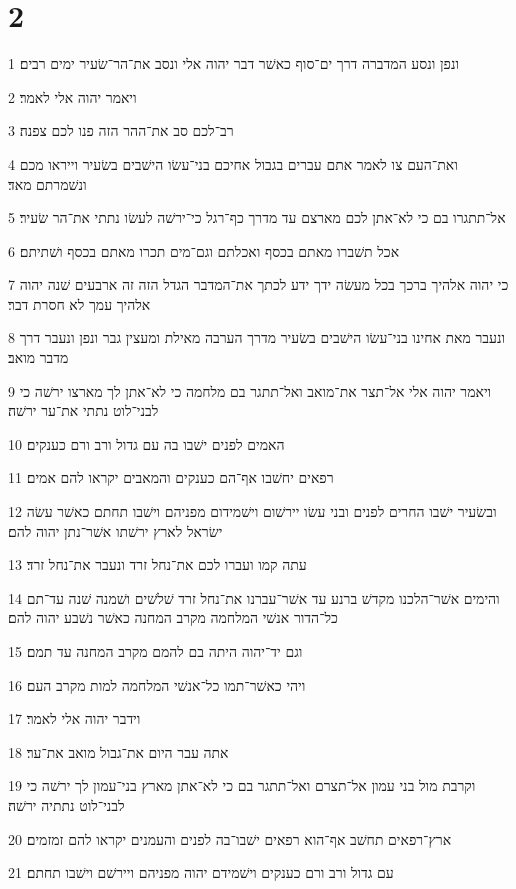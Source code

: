 \chapter{2}

\par 1 ונפן ונסע המדברה דרך ים־סוף כאשׁר דבר יהוה אלי ונסב את־הר־שׂעיר ימים רבים׃
\par 2 ויאמר יהוה אלי לאמר׃
\par 3 רב־לכם סב את־ההר הזה פנו לכם צפנה׃
\par 4 ואת־העם צו לאמר אתם עברים בגבול אחיכם בני־עשׂו הישׁבים בשׂעיר וייראו מכם ונשׁמרתם מאד׃
\par 5 אל־תתגרו בם כי לא־אתן לכם מארצם עד מדרך כף־רגל כי־ירשׁה לעשׂו נתתי את־הר שׂעיר׃
\par 6 אכל תשׁברו מאתם בכסף ואכלתם וגם־מים תכרו מאתם בכסף ושׁתיתם׃
\par 7 כי יהוה אלהיך ברכך בכל מעשׂה ידך ידע לכתך את־המדבר הגדל הזה זה ארבעים שׁנה יהוה אלהיך עמך לא חסרת דבר׃
\par 8 ונעבר מאת אחינו בני־עשׂו הישׁבים בשׂעיר מדרך הערבה מאילת ומעצין גבר ונפן ונעבר דרך מדבר מואב׃
\par 9 ויאמר יהוה אלי אל־תצר את־מואב ואל־תתגר בם מלחמה כי לא־אתן לך מארצו ירשׁה כי לבני־לוט נתתי את־ער ירשׁה׃
\par 10 האמים לפנים ישׁבו בה עם גדול ורב ורם כענקים׃
\par 11 רפאים יחשׁבו אף־הם כענקים והמאבים יקראו להם אמים׃
\par 12 ובשׂעיר ישׁבו החרים לפנים ובני עשׂו יירשׁום וישׁמידום מפניהם וישׁבו תחתם כאשׁר עשׂה ישׂראל לארץ ירשׁתו אשׁר־נתן יהוה להם׃
\par 13 עתה קמו ועברו לכם את־נחל זרד ונעבר את־נחל זרד׃
\par 14 והימים אשׁר־הלכנו מקדשׁ ברנע עד אשׁר־עברנו את־נחל זרד שׁלשׁים ושׁמנה שׁנה עד־תם כל־הדור אנשׁי המלחמה מקרב המחנה כאשׁר נשׁבע יהוה להם׃
\par 15 וגם יד־יהוה היתה בם להמם מקרב המחנה עד תמם׃
\par 16 ויהי כאשׁר־תמו כל־אנשׁי המלחמה למות מקרב העם׃
\par 17 וידבר יהוה אלי לאמר׃
\par 18 אתה עבר היום את־גבול מואב את־ער׃
\par 19 וקרבת מול בני עמון אל־תצרם ואל־תתגר בם כי לא־אתן מארץ בני־עמון לך ירשׁה כי לבני־לוט נתתיה ירשׁה׃
\par 20 ארץ־רפאים תחשׁב אף־הוא רפאים ישׁבו־בה לפנים והעמנים יקראו להם זמזמים׃
\par 21 עם גדול ורב ורם כענקים וישׁמידם יהוה מפניהם ויירשׁם וישׁבו תחתם׃
